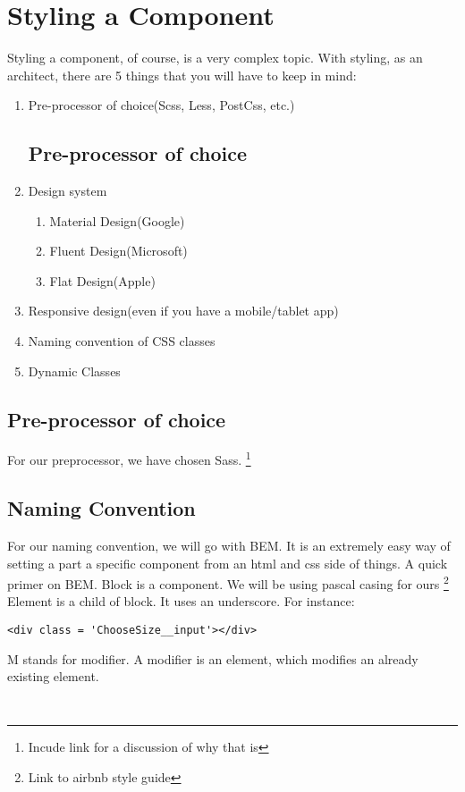 \maketitle{}
\section{ Styling a Component }

Styling a component, of course, is a very complex topic. With styling, as an
architect, there are 5 things that you will have to keep in mind:
\begin{enumerate}
  \item Pre-processor of choice(Scss, Less, PostCss, etc.)
  \subsection{ Pre-processor of choice }
  \item Design system
    \begin{enumerate}
      \item Material Design(Google)
      \item Fluent Design(Microsoft)
      \item Flat Design(Apple)
    \end{enumerate}
  \item Responsive design(even if you have a mobile/tablet app)
  \item Naming convention of CSS classes
  \item Dynamic Classes
\end{enumerate}

\subsection{ Pre-processor of choice }
For our preprocessor, we have chosen Sass. \footnote{Incude link for a
discussion of why that is}

\subsection{ Naming Convention }
For our naming convention, we will go with BEM. It is an extremely easy way
of setting a part a specific component from an html and css side of things. A
quick primer on BEM.
Block is a component. We will be using pascal casing for ours \footnote{Link to
airbnb style guide}
Element is a child of block. It uses an underscore. For instance:
\begin{verbatim}
<div class = 'ChooseSize__input'></div>
\end{verbatim}
M stands for modifier. A modifier is an element, which modifies an already
existing element.
\begin{verbatim}
  
\end{verbatim}


